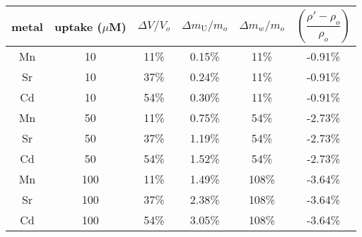 \begin{tabular}{cccccc}
	\toprule
	metal
	& uptake ($\mu$M)
	& $\Delta V / V_o$
	& $\Delta m_{\text{U}} / m_o$
	& $\Delta m_w / m_o$
	& $\left(\dfrac{\rho'-\rho_o}{\rho_o}\right)$ \\
	\midrule
	Mn & 10 & 11\% & 0.15\% & 11\% & -0.91\% \\
	Sr & 10 & 37\% & 0.24\% & 11\% & -0.91\% \\
	Cd & 10 & 54\% & 0.30\% & 11\% & -0.91\% \\
	Mn & 50 & 11\% & 0.75\% & 54\% & -2.73\% \\
	Sr & 50 & 37\% & 1.19\% & 54\% & -2.73\% \\
	Cd & 50 & 54\% & 1.52\% & 54\% & -2.73\% \\
	Mn & 100 & 11\% & 1.49\% & 108\% & -3.64\% \\
	Sr & 100 & 37\% & 2.38\% & 108\% & -3.64\% \\
	Cd & 100 & 54\% & 3.05\% & 108\% & -3.64\% \\
	\bottomrule
\end{tabular}
